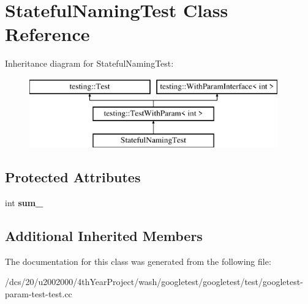 \hypertarget{classStatefulNamingTest}{}\section{Stateful\+Naming\+Test Class Reference}
\label{classStatefulNamingTest}
Inheritance diagram for Stateful\+Naming\+Test\+:\begin{figure}[H]
\begin{center}
\leavevmode
\includegraphics[height=3.000000cm]{classStatefulNamingTest}
\end{center}
\end{figure}
\subsection*{Protected Attributes}
\begin{DoxyCompactItemize}
\item 
\mbox{\label{classStatefulNamingTest_ad719a1c2919c304bfe840313142a376a}} 
int {\bfseries sum\+\_\+}
\end{DoxyCompactItemize}
\subsection*{Additional Inherited Members}


The documentation for this class was generated from the following file\+:\begin{DoxyCompactItemize}
\item 
/dcs/20/u2002000/4th\+Year\+Project/wash/googletest/googletest/test/googletest-\/param-\/test-\/test.\+cc\end{DoxyCompactItemize}
